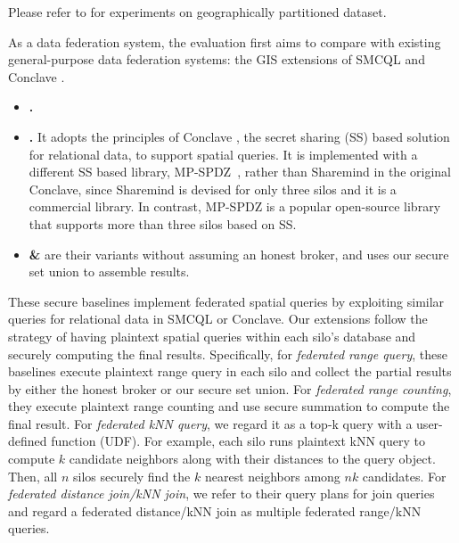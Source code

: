 Please refer to  for experiments on geographically partitioned dataset.

As a data federation system, the evaluation first aims to compare \sysname with existing general-purpose data federation systems: the GIS extensions of SMCQL \cite{vldb17smcql} and Conclave \cite{eurosys19conclave}.

\begin{itemize}
    \item \textbf{\smcql.} 
    
    \item \textbf{\conclave.} 
    It adopts the principles of Conclave \cite{eurosys19conclave}, the secret sharing (SS) based solution for relational data, to support spatial queries.
    It is implemented with a different SS based library, MP-SPDZ~\cite{DBLP:conf/ccs/Keller20}, rather than Sharemind \cite{DBLP:conf/esorics/BogdanovLW08} in the original Conclave,
    since Sharemind is devised for only three silos \cite{DBLP:journals/ftsec/EvansKR18} and it is a commercial library.
    In contrast, MP-SPDZ is a popular open-source library that supports more than three silos based on SS.

    \item \textbf{\smcqlext \& \conclaveext} are their variants without assuming an honest broker, and uses our secure set union to assemble results.
\end{itemize}


These secure baselines implement federated spatial queries by exploiting similar queries for relational data in SMCQL or Conclave.
Our extensions follow the strategy of having plaintext spatial queries within each silo's database and securely computing the final results.
Specifically, for \textit{federated range query}, these baselines execute plaintext range query in each silo and collect the partial results by either the honest broker or our secure set union.
For \textit{federated range counting}, they execute plaintext range counting and use secure summation to compute the final result.
For \textit{federated kNN query}, we regard it as a top-k query with a user-defined function (UDF).
For example, each silo runs plaintext kNN query to compute $k$ candidate neighbors along with their distances to the query object. Then, all $n$ silos securely find the $k$ nearest neighbors among $nk$ candidates.
For \textit{federated distance join/kNN join}, we refer to their query plans for join queries and regard a federated distance/kNN join as multiple federated range/kNN queries.

